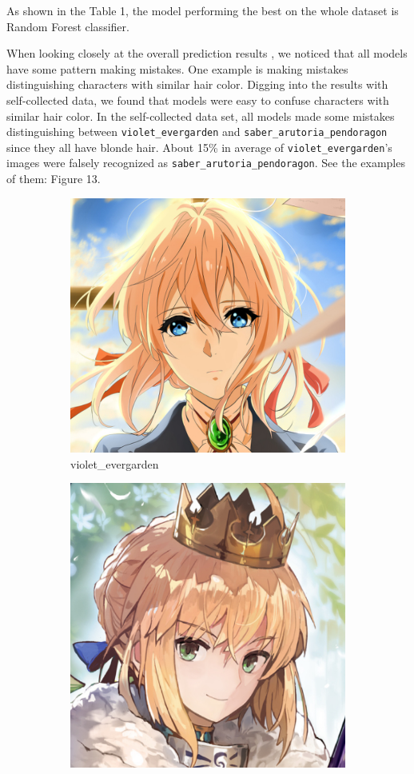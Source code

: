 \documentclass[11.5pt]{article}
\begin{document}
\begin{enumerate}
\begin{itemize}
            As shown in the Table 1, the model performing the best on the whole dataset is Random Forest classifier.

            When looking closely at the overall prediction results , we noticed that all models have some pattern making mistakes.
            One example is making mistakes distinguishing characters with similar hair color.
            Digging into the results with self-collected data, we found that models were easy to confuse characters with similar hair color.
            In the self-collected data set, all models made some mistakes distinguishing between \texttt{violet\_evergarden} and \texttt{saber\_arutoria\_pendoragon} since they all have blonde hair.
            About 15\% in average of \texttt{violet\_evergarden}'s images were falsely recognized as \texttt{saber\_arutoria\_pendoragon}.
            See the examples of them: Figure 13.
            \begin{figure}[h!]
                \begin{subfigure}[b]{0.5\linewidth}
                    \centering
                    \includegraphics[width=0.5\linewidth]{images/violet.png}
                    \caption{violet\_evergarden}
                \end{subfigure}
                \begin{subfigure}[b]{0.5\linewidth}
                    \centering
                    \includegraphics[width=0.5\linewidth]{images/saber2.png}

\end{subfigure}
\end{figure}
\end{itemize}
\end{enumerate}
\end{document}
